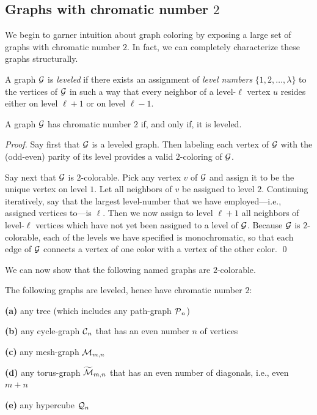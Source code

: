 \subsection{Graphs with chromatic number $2$}
\label{sec:2-color-graphs}

We begin to garner intuition about graph coloring by exposing a large
set of graphs with chromatic number $2$.  In fact, we can completely
characterize these graphs structurally.

A graph $\mbox{$\cal G$}$ is {\it leveled}  if there exists
an assignment of {\it level numbers} $\{ 1, 2, \ldots, \lambda\}$ to the
vertices of $\mbox{$\cal G$}$ in such a way that every neighbor of a level-$\ell$ vertex
$u$ resides either on level $\ell +1$ or on level $\ell -1$.

\begin{prop}
\label{thm:leveled=2-color}
A graph $\mbox{$\cal G$}$ has chromatic number $2$ if, and only if, it is leveled.
\end{prop}

\begin{proof}
Say first that $\mbox{$\cal G$}$ is a leveled graph.  Then labeling each vertex of
$\mbox{$\cal G$}$ with the (odd-even) parity of its level provides a valid
$2$-coloring of $\mbox{$\cal G$}$.

Say next that $\mbox{$\cal G$}$ is $2$-colorable.  Pick any vertex $v$ of $\mbox{$\cal G$}$ and
assign it to be the unique vertex on level $1$.  Let all neighbors of
$v$ be assigned to level $2$.  Continuing iteratively, say that the
largest level-number that we have employed---i.e., assigned vertices
to---is $\ell$.  Then we now assign to level $\ell +1$ all neighbors
of level-$\ell$ vertices which have not yet been assigned to a level of
$\mbox{$\cal G$}$.  Because $\mbox{$\cal G$}$ is $2$-colorable, each of the levels we have
specified is monochromatic, so that each edge of $\mbox{$\cal G$}$ connects a vertex
of one color with a vertex of the other color.  \qed
\end{proof}

We can now show that the following named graphs are $2$-colorable.

\begin{corol}
\label{thm:list-2-colorables}
The following graphs are leveled, hence have chromatic number $2$:

{\bf (a)}
any tree (which includes any path-graph $\mbox{$\cal P$}_n$)

{\bf (b)}
any cycle-graph $\mbox{$\cal C$}_n$ that has an even number $n$ of vertices

{\bf (c)}
any mesh-graph $\mbox{$\cal M$}_{m,n}$

{\bf (d)}
any torus-graph $\widetilde{\mbox{$\cal M$}}_{m,n}$ that has an even number of
diagonals, i.e., even $m+n$

{\bf (e)}
any hypercube $\mbox{$\cal Q$}_n$
\end{corol}

